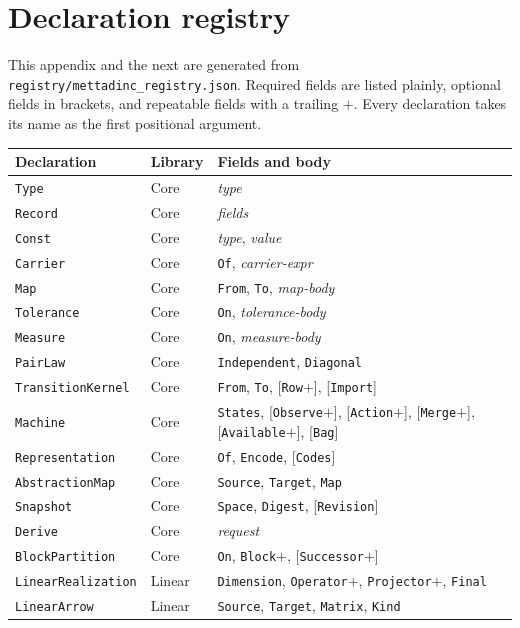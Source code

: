 \documentclass[11pt]{article}
\newcommand{\code}[1]{\texttt{#1}}
\theoremstyle{definition}
\theoremstyle{plain}
\begin{document}
\section{Declaration registry}\label{app:grammar}
This appendix and the next are generated from \code{registry/mettadinc\_registry.json}. Required fields are listed plainly, optional fields in brackets, and repeatable fields with a trailing $+$. Every declaration takes its name as the first positional argument.
{\footnotesize\begin{longtable}{>{\raggedright\arraybackslash}p{3.0cm}>{\raggedright\arraybackslash}p{2.0cm}>{\raggedright\arraybackslash}p{9.0cm}}
\toprule Declaration & Library & Fields and body\\ \midrule \endhead
\code{Type} & Core & \emph{type}\\
\code{Record} & Core & \emph{fields}\\
\code{Const} & Core & \emph{type}, \emph{value}\\
\code{Carrier} & Core & \code{Of}, \emph{carrier-expr}\\
\code{Map} & Core & \code{From}, \code{To}, \emph{map-body}\\
\code{Tolerance} & Core & \code{On}, \emph{tolerance-body}\\
\code{Measure} & Core & \code{On}, \emph{measure-body}\\
\code{PairLaw} & Core & \code{Independent}, \code{Diagonal}\\
\code{TransitionKernel} & Core & \code{From}, \code{To}, [\code{Row}$+$], [\code{Import}]\\
\code{Machine} & Core & \code{States}, [\code{Observe}$+$], [\code{Action}$+$], [\code{Merge}$+$], [\code{Available}$+$], [\code{Bag}]\\
\code{Representation} & Core & \code{Of}, \code{Encode}, [\code{Codes}]\\
\code{AbstractionMap} & Core & \code{Source}, \code{Target}, \code{Map}\\
\code{Snapshot} & Core & \code{Space}, \code{Digest}, [\code{Revision}]\\
\code{Derive} & Core & \emph{request}\\
\code{BlockPartition} & Core & \code{On}, \code{Block}$+$, [\code{Successor}$+$]\\
\code{LinearRealization} & Linear & \code{Dimension}, \code{Operator}$+$, \code{Projector}$+$, \code{Final}\\
\code{LinearArrow} & Linear & \code{Source}, \code{Target}, \code{Matrix}, \code{Kind}\\

\end{longtable}}
\end{document}
